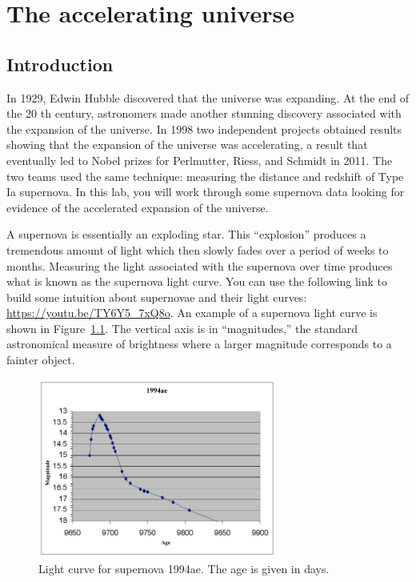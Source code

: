 \chapter{The accelerating universe}

\section{Introduction}

In 1929, Edwin Hubble discovered that the universe was expanding. At
the end of the 20 th century, astronomers made another stunning
discovery associated with the expansion of the universe. In 1998 two
independent projects obtained results showing that the expansion of
the universe was accelerating, a result that eventually led to Nobel
prizes for Perlmutter, Riess, and Schmidt in 2011. The two teams used
the same technique: measuring the distance and redshift of Type Ia
supernova. In this lab, you will work through some supernova data
looking for evidence of the accelerated expansion of the universe.

A supernova is essentially an exploding star. This ``explosion'' produces
a tremendous amount of light which then slowly fades over a period of
weeks to months. Measuring the light associated with the supernova
over time produces what is known as the supernova light curve. You can
use the following link to build some intuition about supernovae and
their light curves: \url{https://youtu.be/TY6Y5_7xQ8o}. An example of a
supernova light curve is shown in Figure~\ref{de:fig:light-curve}. The vertical axis is in ``magnitudes,'' the
standard astronomical measure of brightness where a larger magnitude
corresponds to a fainter object.

\begin{figure}
	\centering
	\includegraphics[width=0.7\textwidth]{dark-energy/light-curve-1994ae}
	\caption{Light curve for supernova 1994ae. The age is given in days.}\label{de:fig:light-curve}
\end{figure}

